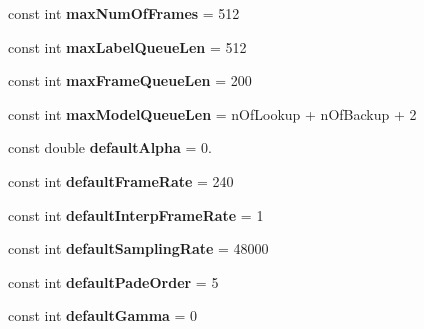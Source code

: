 \begin{DoxyCompactItemize}
\item 
\hypertarget{namespace_m_a_g_e_ad4a58c876332c54ba8b05b80cf82d00d}{const int {\bfseries max\-Num\-Of\-Frames} = 512}\label{namespace_m_a_g_e_ad4a58c876332c54ba8b05b80cf82d00d}

\item 
\hypertarget{namespace_m_a_g_e_a0f62945e9c0cf6ecc76a2b181497556c}{const int {\bfseries max\-Label\-Queue\-Len} = 512}\label{namespace_m_a_g_e_a0f62945e9c0cf6ecc76a2b181497556c}

\item 
\hypertarget{namespace_m_a_g_e_a1039e56e904d9d67f056bb9e4277b0b5}{const int {\bfseries max\-Frame\-Queue\-Len} = 200}\label{namespace_m_a_g_e_a1039e56e904d9d67f056bb9e4277b0b5}

\item 
\hypertarget{namespace_m_a_g_e_adef8aabcbe7798af46e9763d5a6e4628}{const int {\bfseries max\-Model\-Queue\-Len} = n\-Of\-Lookup + n\-Of\-Backup + 2}\label{namespace_m_a_g_e_adef8aabcbe7798af46e9763d5a6e4628}

\item 
\hypertarget{namespace_m_a_g_e_ab2bf5e717d3e772cdef44df8bd6557ad}{const double {\bfseries default\-Alpha} = 0.}\label{namespace_m_a_g_e_ab2bf5e717d3e772cdef44df8bd6557ad}

\item 
\hypertarget{namespace_m_a_g_e_a1f02bdc93d4ba82b88cd94ea5748059b}{const int {\bfseries default\-Frame\-Rate} = 240}\label{namespace_m_a_g_e_a1f02bdc93d4ba82b88cd94ea5748059b}

\item 
\hypertarget{namespace_m_a_g_e_adbbdf48e539c84536079ea02ae1cb1d3}{const int {\bfseries default\-Interp\-Frame\-Rate} = 1}\label{namespace_m_a_g_e_adbbdf48e539c84536079ea02ae1cb1d3}

\item 
\hypertarget{namespace_m_a_g_e_aaf66bc71efbd694a01ccf3121c3cc610}{const int {\bfseries default\-Sampling\-Rate} = 48000}\label{namespace_m_a_g_e_aaf66bc71efbd694a01ccf3121c3cc610}

\item 
\hypertarget{namespace_m_a_g_e_a5f40bad0e2700f9d7eec355420209cb4}{const int {\bfseries default\-Pade\-Order} = 5}\label{namespace_m_a_g_e_a5f40bad0e2700f9d7eec355420209cb4}

\item 
\hypertarget{namespace_m_a_g_e_a9af0a3b9dc76d8b2e39f10fc8cc10ec7}{const int {\bfseries default\-Gamma} = 0}\label{namespace_m_a_g_e_a9af0a3b9dc76d8b2e39f10fc8cc10ec7}


\end{DoxyCompactItemize}
